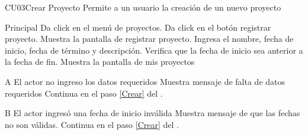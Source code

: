 
% 



	\begin{UseCase}{CU03}{Crear Proyecto}{
		Permite a un usuario la creación de un nuevo proyecto
	}
	\end{UseCase}
	\begin{UCtrayectoria}{Principal}
		\UCpaso[\UCactor] Da click en el menú de proyectos.
		\UCpaso[\UCactor]Da click en el botón registrar proyecto.
       	\UCpaso Muestra la pantalla de registrar proyecto.\label{Crear}
        \UCpaso[\UCactor] Ingresa el nombre, fecha de inicio, fecha de término y descripción.  
        \UCpaso Verifica que la fecha de inicio sea anterior a la fecha de fin. 
       \UCpaso  Muestra la pantalla de mis proyectos
	\end{UCtrayectoria}

		\begin{UCtrayectoriaA}{A}{ El actor no ingreso los datos requeridos}
			\UCpaso Muestra mensaje de falta de datos requeridos
			\UCpaso Continua en el paso \ref{Crear} del .
		\end{UCtrayectoriaA}
		\begin{UCtrayectoriaA}{B}{ El actor ingresó una fecha de inicio inválida}
			\UCpaso Muestra mensaje de que las fechas no son válidas.
			\UCpaso Continua en el paso \ref{Crear} del .
		\end{UCtrayectoriaA}
		
		
